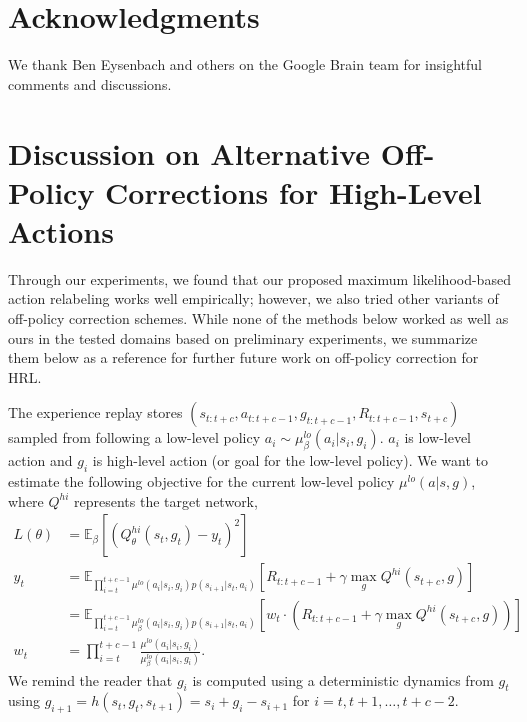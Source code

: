 \documentclass{article}
\begin{document}
\section{Acknowledgments}
We thank Ben Eysenbach and others on the Google Brain
team for insightful comments and discussions.




\appendix

\section{Discussion on Alternative Off-Policy Corrections for High-Level Actions}

Through our experiments, we found that our proposed maximum likelihood-based action relabeling works well empirically; however, we also tried other variants of off-policy correction schemes. While none of the methods below worked as well as ours in the tested domains based on preliminary experiments, we summarize them below as a reference for further future work on off-policy correction for HRL. 

The experience replay stores $(s_{t:t+c}, a_{t:t+c-1}, g_{t:t+c-1}, R_{t:t+c-1},s_{t+c})$ sampled from following a low-level policy $a_i\sim\mu_\beta^{lo}(a_i|s_i, g_i)$. $a_i$ is low-level action and $g_i$ is high-level action (or goal for the low-level policy). 
We want to estimate the following objective for the current low-level policy $\mu^{lo}(a|s,g)$, where $Q^{hi}$ represents the target network,
\begin{align}
 L(\theta) &= \mathbb{E}_{\beta}\left[ \left( Q^{hi}_\theta(s_t,g_t)  - y_t\right)^2 \right] \\
 y_t &= \mathbb{E}_{\prod_{i=t}^{t+c-1} \mu^{lo}(a_i|s_i,g_i)p(s_{i+1}|s_t,a_i)}\left[R_{t:t+c-1} + \gamma \max_{g} Q^{hi} (s_{t+c},g)\right] \\
 &= \mathbb{E}_{\prod_{i=t}^{t+c-1} \mu^{lo}_\beta(a_i|s_i,g_i)p(s_{i+1}|s_t,a_i)}\left[w_t\cdot\left(R_{t:t+c-1} + \gamma \max_{g} Q^{hi} (s_{t+c},g)\right)\right]\\ \label{eq:oco_def}
w_t &= \prod_{i=t}^{t+c-1} \frac{\mu^{lo}(a_i|s_i,g_i)}{\mu_\beta^{lo}(a_i|s_i,g_i)}.
\end{align}
We remind the reader that $g_i$ is computed using a deterministic dynamics from $g_t$ using $g_{i+1}=h(s_t,g_t,s_{t+1})=s_i + g_i - s_{i+1}$ for $i=t,t+1,\dots,t+c-2$.
\end{document}

